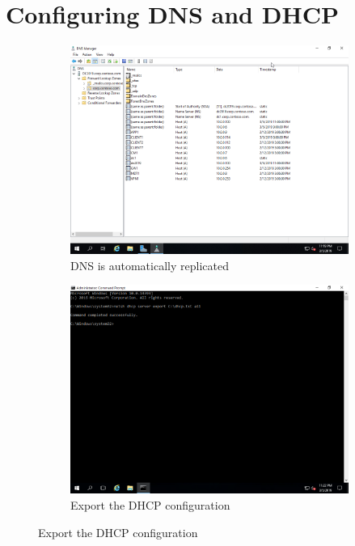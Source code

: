 \section{Configuring DNS and DHCP}
\begin{figure}[!htb]
	\begin{subfigure}{0.5\textwidth}
		\captionsetup{width=0.8\linewidth}
		\includegraphics[width=0.9\linewidth]{img/Methodologie/Migration24.png}
		\centering
		\caption{DNS is automatically replicated}
	\end{subfigure}
	\begin{subfigure}{0.5\textwidth}
		\captionsetup{width=0.8\linewidth}
		\includegraphics[width=0.9\linewidth]{img/Methodologie/Migration25.png} 
		\centering
		\caption{Export the DHCP configuration}
	\end{subfigure}
\end{figure}
